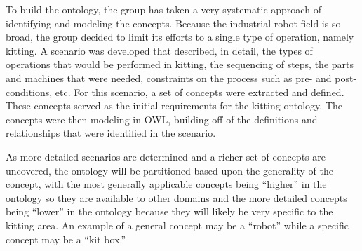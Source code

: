 \documentclass[a4paper, 10pt, conference]{ieeeconf}      %
\begin{document}
To build the ontology, the group has taken a very systematic approach of identifying and modeling the concepts. Because the industrial robot field is so broad, the group decided to limit its efforts to a single type of operation, namely kitting. A scenario was developed that described, in detail, the types of operations that would be performed in kitting, the sequencing of steps, the parts and machines that were needed, constraints on the process such as pre- and post-conditions, etc. For this scenario, a set of concepts were extracted and defined. These concepts served as the initial requirements for the kitting ontology. The concepts were then modeling in OWL, building off of the definitions and relationships that were identified in the scenario.

As more detailed scenarios are determined and a richer set of concepts are uncovered, the ontology will be partitioned based upon the generality of the concept, with the most generally applicable concepts being ``higher'' in the ontology so they are available to other domains and the more detailed concepts being ``lower'' in the ontology because they will likely be very specific to the kitting area. An example of a general concept may be a ``robot'' while a specific concept may be a ``kit box.''
\end{document}
